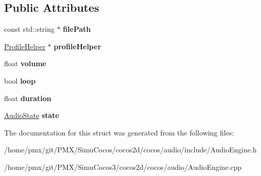 \subsection*{Public Attributes}
\begin{DoxyCompactItemize}
\item 
\mbox{\label{structexperimental_1_1AudioEngine_1_1AudioInfo_aad4e08899de12ad24c13dfc8f692a545}} 
const std\+::string $\ast$ {\bfseries file\+Path}
\item 
\mbox{\label{structexperimental_1_1AudioEngine_1_1AudioInfo_ab9093f1509799215a3a3b624419fb3b7}} 
\hyperlink{structexperimental_1_1AudioEngine_1_1ProfileHelper}{Profile\+Helper} $\ast$ {\bfseries profile\+Helper}
\item 
\mbox{\label{structexperimental_1_1AudioEngine_1_1AudioInfo_a854d0969c49d87ec207f16520eb3c628}} 
float {\bfseries volume}
\item 
\mbox{\label{structexperimental_1_1AudioEngine_1_1AudioInfo_a1075b3a4789dde494dd692286f7fca80}} 
bool {\bfseries loop}
\item 
\mbox{\label{structexperimental_1_1AudioEngine_1_1AudioInfo_a1e4db94635ada35be7ae4610d994bbea}} 
float {\bfseries duration}
\item 
\mbox{\label{structexperimental_1_1AudioEngine_1_1AudioInfo_adfe4160959241dc0e90d8c868c8fda9c}} 
\hyperlink{classexperimental_1_1AudioEngine_ab7becf9cab1f5e4cac089a1f6e3785e6}{Audio\+State} {\bfseries state}
\end{DoxyCompactItemize}


The documentation for this struct was generated from the following files\+:\begin{DoxyCompactItemize}
\item 
/home/pmx/git/\+P\+M\+X/\+Simu\+Cocos/cocos2d/cocos/audio/include/Audio\+Engine.\+h\item 
/home/pmx/git/\+P\+M\+X/\+Simu\+Cocos3/cocos2d/cocos/audio/Audio\+Engine.\+cpp\end{DoxyCompactItemize}
